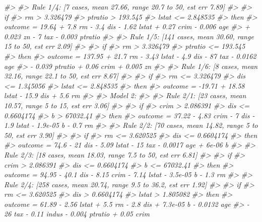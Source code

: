 \documentclass[]{book}
\newenvironment{Shaded}{\begin{snugshade}}{\end{snugshade}}
\newcommand{\CommentTok}[1]{\textcolor[rgb]{0.56,0.35,0.01}{\textit{#1}}}
\begin{document}
\begin{Shaded}
\begin{Highlighting}[]
\CommentTok{#> }
\CommentTok{#>   Rule 1/4: [7 cases, mean 27.66, range 20.7 to 50, est err 7.89]}
\CommentTok{#> }
\CommentTok{#>     if}
\CommentTok{#>  rm > 3.326479}
\CommentTok{#>  ptratio > 193.545}
\CommentTok{#>  lstat <= 2.848535}
\CommentTok{#>     then}
\CommentTok{#>  outcome = 19.64 + 7.8 rm - 3.4 dis - 1.62 lstat + 0.27 crim - 0.006 age}
\CommentTok{#>            + 0.023 zn - 7 tax - 0.003 ptratio}
\CommentTok{#> }
\CommentTok{#>   Rule 1/5: [141 cases, mean 30.60, range 15 to 50, est err 2.09]}
\CommentTok{#> }
\CommentTok{#>     if}
\CommentTok{#>  rm > 3.326479}
\CommentTok{#>  ptratio <= 193.545}
\CommentTok{#>     then}
\CommentTok{#>  outcome = 137.95 + 21.7 rm - 3.43 lstat - 4.9 dis - 87 tax - 0.0162 age}
\CommentTok{#>            - 0.039 ptratio + 0.06 crim + 0.005 zn}
\CommentTok{#> }
\CommentTok{#>   Rule 1/6: [8 cases, mean 32.16, range 22.1 to 50, est err 8.67]}
\CommentTok{#> }
\CommentTok{#>     if}
\CommentTok{#>  rm <= 3.326479}
\CommentTok{#>  dis <= 1.345056}
\CommentTok{#>  lstat <= 2.848535}
\CommentTok{#>     then}
\CommentTok{#>  outcome = -19.71 + 18.58 lstat - 15.9 dis + 5.6 rm}
\CommentTok{#> }
\CommentTok{#> Model 2:}
\CommentTok{#> }
\CommentTok{#>   Rule 2/1: [23 cases, mean 10.57, range 5 to 15, est err 3.06]}
\CommentTok{#> }
\CommentTok{#>     if}
\CommentTok{#>  crim > 2.086391}
\CommentTok{#>  dis <= 0.6604174}
\CommentTok{#>  b > 67032.41}
\CommentTok{#>     then}
\CommentTok{#>  outcome = 37.22 - 4.83 crim - 7 dis - 1.9 lstat - 1.9e-05 b - 0.7 rm}
\CommentTok{#> }
\CommentTok{#>   Rule 2/2: [70 cases, mean 14.82, range 5 to 50, est err 3.90]}
\CommentTok{#> }
\CommentTok{#>     if}
\CommentTok{#>  rm <= 3.620525}
\CommentTok{#>  dis <= 0.6604174}
\CommentTok{#>     then}
\CommentTok{#>  outcome = 74.6 - 21 dis - 5.09 lstat - 15 tax - 0.0017 age + 6e-06 b}
\CommentTok{#> }
\CommentTok{#>   Rule 2/3: [18 cases, mean 18.03, range 7.5 to 50, est err 6.81]}
\CommentTok{#> }
\CommentTok{#>     if}
\CommentTok{#>  crim > 2.086391}
\CommentTok{#>  dis <= 0.6604174}
\CommentTok{#>  b <= 67032.41}
\CommentTok{#>     then}
\CommentTok{#>  outcome = 94.95 - 40.1 dis - 8.15 crim - 7.14 lstat - 3.5e-05 b - 1.3 rm}
\CommentTok{#> }
\CommentTok{#>   Rule 2/4: [258 cases, mean 20.74, range 9.5 to 36.2, est err 1.92]}
\CommentTok{#> }
\CommentTok{#>     if}
\CommentTok{#>  rm <= 3.620525}
\CommentTok{#>  dis > 0.6604174}
\CommentTok{#>  lstat > 1.805082}
\CommentTok{#>     then}
\CommentTok{#>  outcome = 61.89 - 2.56 lstat + 5.5 rm - 2.8 dis + 7.3e-05 b - 0.0132 age}
\CommentTok{#>            - 26 tax - 0.11 indus - 0.004 ptratio + 0.05 crim}

\end{Highlighting}
\end{Shaded}
\end{document}
